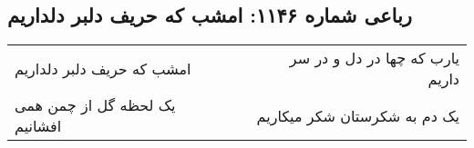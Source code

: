 \begin{center}
\section*{رباعی شماره ۱۱۴۶: امشب که حریف دلبر دلداریم}
\label{sec:1146}
\begin{longtable}{l p{0.5cm} r}
امشب که حریف دلبر دلداریم
&&
یارب که چها در دل و در سر داریم
\\
یک لحظه گل از چمن همی افشانیم
&&
یک دم به شکرستان شکر میکاریم
\\
\end{longtable}
\end{center}
